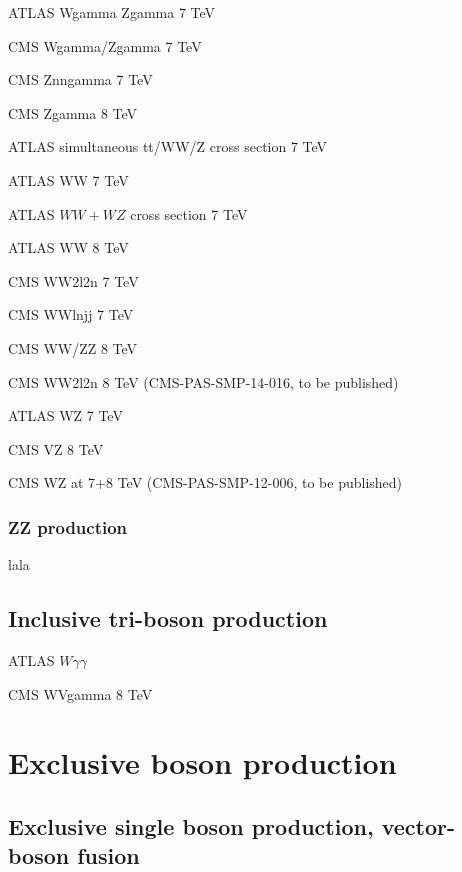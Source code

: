 \documentclass[12pt]{iopart}
\begin{document}
ATLAS Wgamma Zgamma 7 TeV~\cite{Aad:2013izg}

CMS Wgamma/Zgamma 7 TeV~\cite{Chatrchyan:2013fya}

CMS Znngamma 7 TeV~\cite{Chatrchyan:2013nda}

CMS Zgamma 8 TeV~\cite{Khachatryan:2015kea}


ATLAS simultaneous tt/WW/Z cross section 7 TeV~\cite{Aad:2014jra}

ATLAS WW 7 TeV~\cite{ATLAS:2012mec}

ATLAS $WW+WZ$ cross section 7 TeV~\cite{Aad:2014mda}

ATLAS WW 8 TeV~\cite{ATLAS-CONF-2014-033}

CMS WW2l2n 7 TeV~\cite{Chatrchyan:2013yaa}

CMS WWlnjj 7 TeV~\cite{Chatrchyan:2012bd}

CMS WW/ZZ 8 TeV~\cite{Chatrchyan:2013oev}

CMS WW2l2n 8 TeV (CMS-PAS-SMP-14-016, to be published)


ATLAS WZ 7 TeV~\cite{Aad:2012twa}

CMS VZ 8 TeV~\cite{Chatrchyan:2014aqa}

CMS WZ at 7+8 TeV (CMS-PAS-SMP-12-006, to be published)

\subsubsection{ZZ production}
\label{sss-ZZprod}

lala







\subsection{Inclusive tri-boson production}

ATLAS $W\gamma\gamma$~\cite{Aad:2015uqa}

CMS WVgamma 8 TeV~\cite{Chatrchyan:2014bza}

\section{Exclusive boson production}
\subsection{Exclusive single boson production, vector-boson fusion}
\end{document}
